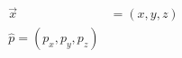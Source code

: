 \documentclass[preview]{standalone}
\begin{document}
\begin{align*}
\begin{aligned} \vec{x} &=(x,y,z) \\ \hat{p}= (p_x, p_y, p_z) \end{aligned}
\end{align*}
\end{document}
